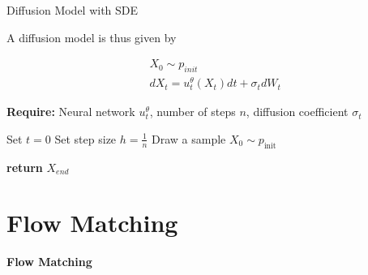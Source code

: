 \documentclass[aspectratio=169,xcolor=dvipsnames,svgnames,x11names,fleqn]{beamer}
\begin{document}
\begin{frame}{Diffusion Model with SDE}

    A diffusion model is thus given by 

    \begin{align*}
        & X_0 \sim p_{init}\\
        & dX_t = u_t^\theta (X_t)dt + \sigma_t dW_t
    \end{align*}

    \scriptsize

    \begin{algorithm}[H]
    \caption{\textbf{Sampling from a Diffusion Model (Euler-Maruyama method)}}
    \DontPrintSemicolon
    
    \textbf{\color{blue}Require:} Neural network $u_t^\theta$, number of steps $n$, diffusion coefficient $\sigma_t$\;
    
    Set $t = 0$\;
    Set step size $h = \frac{1}{n}$\;
    Draw a sample $X_0 \sim p_{\text{init}}$\;
    
    \textbf{\color{blue}return} $X_{end}$
\end{algorithm}
    
\end{frame}


    \section{Flow Matching}
    
    \begin{frame}{}
    \begin{center}
        \huge \bf \color{DarkBlue}
        Flow Matching
    \end{center}
    \end{frame}
\end{document}
